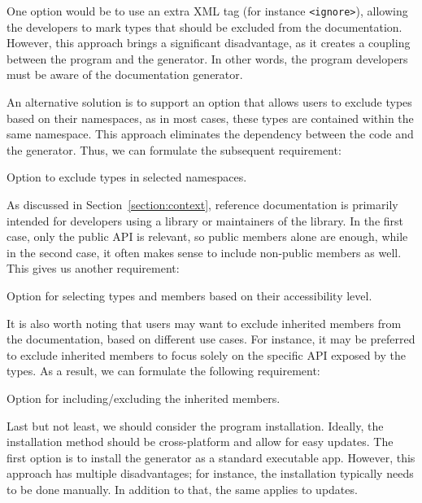 One option would be to use an extra XML tag (for instance \texttt{<ignore>}), allowing the developers to mark types that should be excluded from the documentation. 
However, this approach brings a significant disadvantage, as it creates a coupling between the program and the generator.
In other words, the program developers must be aware of the documentation generator.

An alternative solution is to support an option that allows users to exclude types based on their namespaces, as in most cases, these types are contained within the same namespace.
This approach eliminates the dependency between the code and the generator.
Thus, we can formulate the subsequent requirement:

\begin{requirement}
    Option to exclude types in selected namespaces.
    \label{req:exclude-namespaces}
\end{requirement}

As discussed in Section~\ref{section:context}, reference documentation is primarily intended for developers using a library or maintainers of the library.
In the first case, only the public API is relevant, so public members alone are enough, while in the second case, it often makes sense to include non-public members as well.
This gives us another requirement:

\begin{requirement}
    Option for selecting types and members based on their accessibility level.
    \label{req:exclude-accessibility}
\end{requirement}

It is also worth noting that users may want to exclude inherited members from the documentation, based on different use cases.
For instance, it may be preferred to exclude inherited members to focus solely on the specific API exposed by the types. 
As a result, we can formulate the following requirement:

\begin{requirement}
    Option for including/excluding the inherited members.
    \label{req:exclude-inherited}
\end{requirement}

Last but not least, we should consider the program installation.
Ideally, the installation method should be cross-platform and allow for easy updates.
The first option is to install the generator as a standard executable app. 
However, this approach has multiple disadvantages; for instance, the installation typically needs to be done manually.
In addition to that, the same applies to updates.


